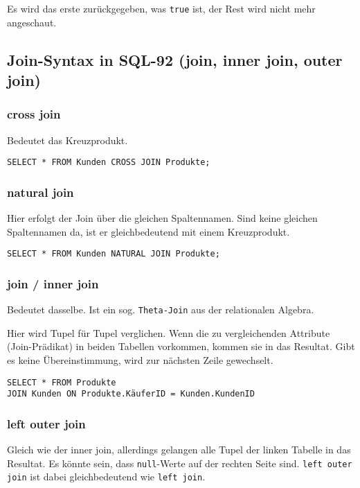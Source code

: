 Es wird das erste zurückgegeben, was \texttt{true} ist, der Rest wird nicht mehr angeschaut.

\subsection{Join-Syntax in SQL-92 (join, inner join, outer join)}
\label{sec:join}

\subsubsection{cross join}
Bedeutet das Kreuzprodukt.

\begin{lstlisting}[caption={Cross Join}]
SELECT * FROM Kunden CROSS JOIN Produkte;
\end{lstlisting}

\subsubsection{natural join}
Hier erfolgt der Join über die gleichen Spaltennamen. Sind keine gleichen Spaltennamen da, ist er gleichbedeutend mit einem Kreuzprodukt.

\begin{lstlisting}[caption={Natural Join}]
SELECT * FROM Kunden NATURAL JOIN Produkte;
\end{lstlisting}

\subsubsection{join / inner join}
Bedeutet dasselbe. Ist ein sog. \texttt{Theta-Join} aus der relationalen Algebra.


Hier wird Tupel für Tupel verglichen. Wenn die zu vergleichenden Attribute (Join-Prädikat) in beiden Tabellen vorkommen, kommen sie in das Resultat. Gibt es keine Übereinstimmung, wird zur nächsten Zeile gewechselt.

\begin{lstlisting}[caption={JOIN ON Beispiel}]
SELECT * FROM Produkte
JOIN Kunden ON Produkte.KäuferID = Kunden.KundenID
\end{lstlisting}

\subsubsection{left outer join}
Gleich wie der inner join, allerdings gelangen alle Tupel der linken Tabelle in das Resultat. Es könnte sein, dass \texttt{null}-Werte auf der rechten Seite sind. \texttt{left outer join} ist dabei gleichbedeutend wie \texttt{left join}.

